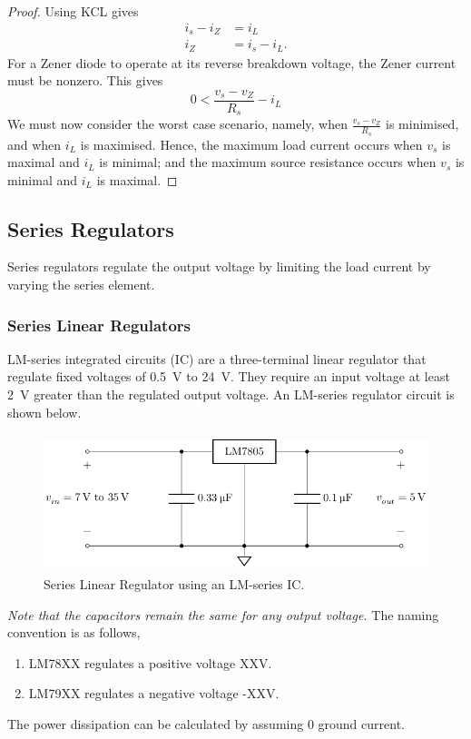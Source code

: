 \documentclass{article}
\begin{document}
\begin{proof}
    Using KCL gives
    \begin{align*}
        i_s - i_Z & = i_L        \\
        i_Z       & = i_s - i_L.
    \end{align*}
    For a Zener diode to operate at its reverse breakdown voltage, the Zener current
    must be nonzero. This gives
    \begin{equation*}
        0 < \frac{v_s - v_Z}{R_s} - i_L
    \end{equation*}
    We must now consider the worst case scenario, namely, when
    \(\displaystyle \frac{v_s - v_Z}{R_s}\) is minimised, and when
    \(i_L\) is maximised. Hence, the maximum load current occurs when
    \(v_s\) is maximal and \(i_L\) is minimal; and the maximum source
    resistance occurs when \(v_s\) is minimal and \(i_L\) is maximal.
\end{proof}
\subsection{Series Regulators}
\begin{definition}
    Series regulators regulate the output voltage by limiting the load current by varying the series element.
\end{definition}
\subsubsection{Series Linear Regulators}
LM-series integrated circuits (IC) are a three-terminal linear
regulator that regulate fixed voltages of \qty{0.5}{V} to \qty{24}{V}.
They require an input voltage at least \qty{2}{V} greater than the
regulated output voltage. An LM-series regulator circuit is shown
below.
\begin{figure}[H]
    \centering
    \includegraphics[height = 4cm, keepaspectratio = true]{figures/series_linear_regulator.pdf}
    \caption{Series Linear Regulator using an LM-series IC.}
\end{figure}
\emph{Note that the capacitors remain the same for any output voltage.}
The naming convention is as follows,
\begin{enumerate}
    \item LM78XX regulates a positive voltage XX\unit{\volt}.
    \item LM79XX regulates a negative voltage -XX\unit{\volt}.
\end{enumerate}
The power dissipation can be calculated by assuming 0 ground current.
\end{document}
